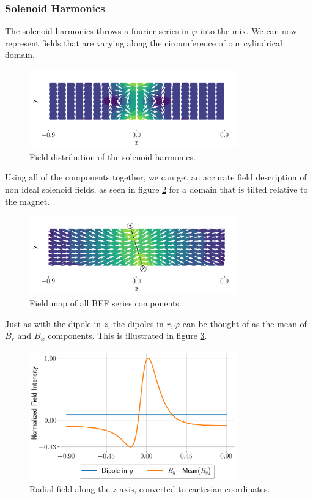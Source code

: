 \subsubsection{Solenoid Harmonics}
\label{subsubsection:solenoid-harmonics}
The solenoid harmonics throws a fourier series in
$\varphi$ into the mix. We can now represent fields that
are varying along the circumference of our cylindrical domain.

\begin{figure}[!h]
    \centering
    \includegraphics[width=0.8\textwidth]{figs/solharm.png}
    \caption{Field distribution of the solenoid harmonics.}
    \label{fig:solharm}
\end{figure}

Using all of the components together, we can get an accurate
field description of non ideal solenoid fields, as seen in figure
\ref{fig:allharmonics} for a domain that is tilted relative to the
magnet.

\begin{figure}[!h]
    \centering
    \includegraphics[width=0.8\textwidth]{figs/allcomponents.png}
    \caption{Field map of all BFF series components.}
    \label{fig:allharmonics}
\end{figure}

Just as with the dipole in $z$, the dipoles in $r,\varphi$
can be thought of as the mean of $B_r$ and $B_\varphi$
components.
This is illustrated in figure \ref{fig:radialplot}.

\begin{figure}[!h]
    \centering
    \includegraphics[width=0.8\textwidth]{figs/radialplot.png}
    \caption{Radial field along the $z$ axis, converted
        to cartesian coordinates.}
    \label{fig:radialplot}
\end{figure}

